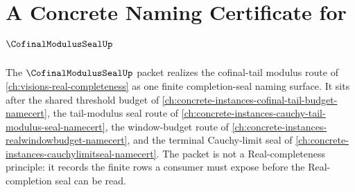 \chapter{A Concrete Naming Certificate for $\CofinalModulusSealUp$}
\label{ch:concrete-instances-cofinal-modulus-seal-namecert}

The $\CofinalModulusSealUp$ packet realizes the cofinal-tail modulus route of \autoref{ch:visions-real-completeness} as one finite completion-seal naming surface. It sits after the shared threshold budget of \autoref{ch:concrete-instances-cofinal-tail-budget-namecert}, the tail-modulus seal route of \autoref{ch:concrete-instances-cauchy-tail-modulus-seal-namecert}, the window-budget route of \autoref{ch:concrete-instances-realwindowbudget-namecert}, and the terminal Cauchy-limit seal of \autoref{ch:concrete-instances-cauchylimitseal-namecert}. The packet is not a Real-completeness principle: it records the finite rows a consumer must expose before the Real-completion seal can be read.



